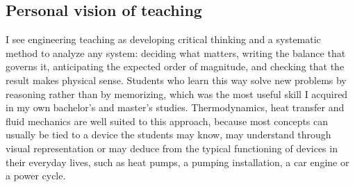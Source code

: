 \documentclass[11pt]{article}
\begin{document}
\subsection{Personal vision of teaching}\label{sec:vision}

I see engineering teaching as developing critical thinking and a systematic method to analyze any system: deciding what matters, writing the balance that governs it, anticipating the expected order of magnitude, and checking that the result makes physical sense. 
Students who learn this way solve new problems by reasoning rather than by memorizing, which was the most useful skill I acquired in my own bachelor's and master's studies. 
Thermodynamics, heat transfer and fluid mechanics are well suited to this approach, because most concepts can usually be tied to a device the students may know, may understand through visual representation or may deduce from the typical functioning of devices in their everyday lives, such as heat pumps, a pumping installation, a car engine or a power cycle.
\end{document}

